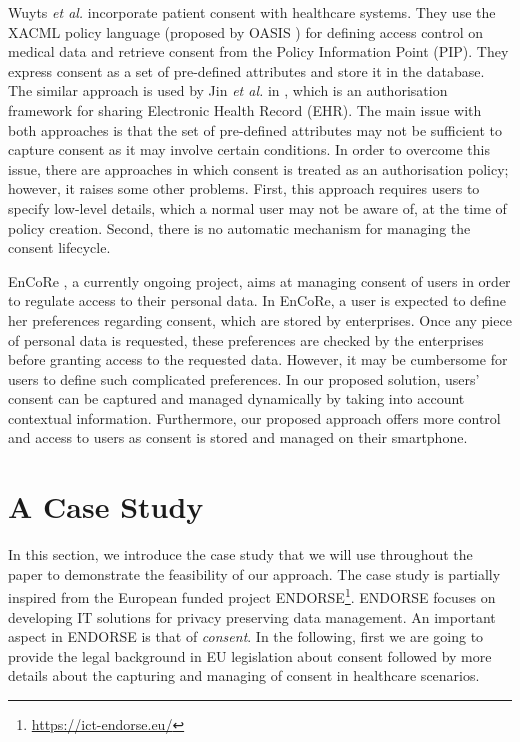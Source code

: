 \documentclass[10pt, conference, compsocconf]{IEEEtran}
\begin{document}
Wuyts \emph{et al.} \cite{Wuyts2011} incorporate patient consent with healthcare systems. They use the XACML policy language \cite{Moses2003} (proposed by OASIS \cite{OASIS}) for defining access control on medical data and retrieve consent from the Policy Information Point (PIP). They express consent as a set of pre-defined attributes and store it in the database. The similar approach is used by Jin \emph{et al.} in \cite{Jin2009}, which is an authorisation framework for sharing Electronic Health Record (EHR). The main issue with both approaches is that the set of pre-defined attributes may not be sufficient to capture consent as it may involve certain conditions. In order to overcome this issue, there are approaches \cite{Asghar2011, OKeefe2005} in which consent is treated as an authorisation policy; however, it raises some other problems. First, this approach requires users to specify low-level details, which a normal user may not be aware of, at the time of policy creation. Second, there is no automatic mechanism for managing the consent lifecycle.

EnCoRe \cite{encore}, a currently ongoing project, aims at managing consent of users in order to regulate access to their personal data. In EnCoRe, a user is expected to define her preferences regarding consent, which are stored by enterprises. Once any piece of personal data is requested, these preferences are checked by the enterprises before granting access to the requested data. However, it may be cumbersome for users to define such complicated preferences. In our proposed solution, users' consent can be captured and managed dynamically by taking into account contextual information. Furthermore, our proposed approach offers more control and access to users as consent is stored and managed on their smartphone.

\section{A Case Study}
\label{sec:case_study}

In this section, we introduce the case study that we will use throughout the paper to demonstrate the feasibility of our approach. The case study is partially inspired from the European funded project ENDORSE\footnote{\url{https://ict-endorse.eu/}}. ENDORSE focuses on developing IT solutions for privacy preserving data management. An important aspect in ENDORSE is that of \emph{consent}. In the following, first we are going to provide the legal background in EU legislation about consent followed by more details about the capturing and managing of consent in healthcare scenarios.
\end{document}
